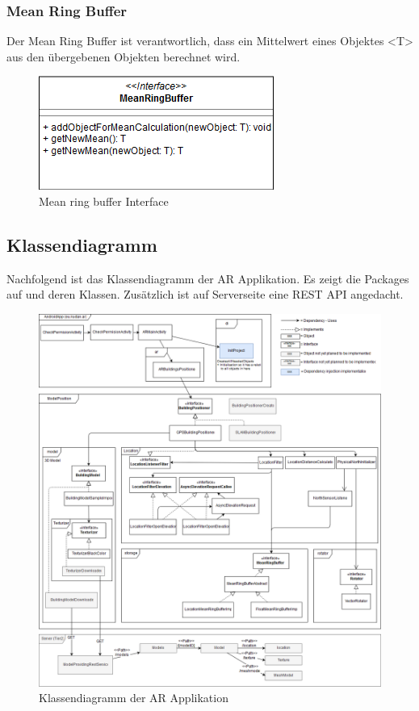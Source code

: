 \documentclass[a4paper]{scrreprt}
\begin{document}
\subsubsection{Mean Ring Buffer}
Der Mean Ring Buffer ist verantwortlich, dass ein Mittelwert eines Objektes <T> aus den übergebenen Objekten berechnet wird.
\begin{figure}[h!]
	\center
	\includegraphics[scale=0.75]{MeanRingBuffer.png}
	\caption{Mean ring buffer Interface}
\end{figure}

\clearpage
\subsection{Klassendiagramm}
Nachfolgend ist das Klassendiagramm der AR Applikation. Es zeigt die Packages auf und deren Klassen. Zusätzlich ist auf Serverseite eine REST API angedacht.

\begin{figure}[h!]
	\center
	\includegraphics[width=\textwidth]{Klassendiagramm.png}
	\caption{Klassendiagramm der AR Applikation}
\end{figure}
\end{document}

